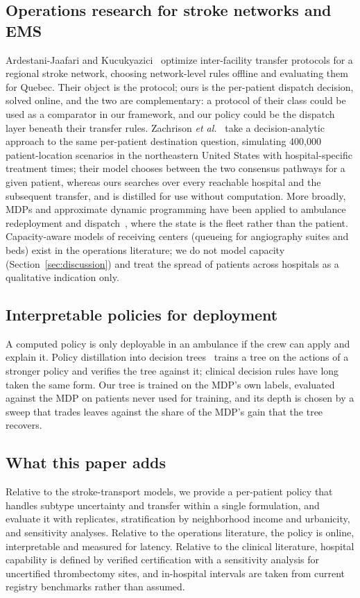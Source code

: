 \subsection{Operations research for stroke networks and EMS}
Ardestani-Jaafari and Kucukyazici~\cite{ardestani2022} optimize inter-facility transfer protocols for a regional stroke network, choosing network-level rules offline and evaluating them for Quebec. Their object is the protocol; ours is the per-patient dispatch decision, solved online, and the two are complementary: a protocol of their class could be used as a comparator in our framework, and our policy could be the dispatch layer beneath their transfer rules. Zachrison \emph{et al.}~\cite{zachrison2026} take a decision-analytic approach to the same per-patient destination question, simulating 400,000 patient-location scenarios in the northeastern United States with hospital-specific treatment times; their model chooses between the two consensus pathways for a given patient, whereas ours searches over every reachable hospital and the subsequent transfer, and is distilled for use without computation. More broadly, MDPs and approximate dynamic programming have been applied to ambulance redeployment and dispatch~\cite{maxwell2010}, where the state is the fleet rather than the patient. Capacity-aware models of receiving centers (queueing for angiography suites and beds) exist in the operations literature; we do not model capacity (Section~\ref{sec:discussion}) and treat the spread of patients across hospitals as a qualitative indication only.

\subsection{Interpretable policies for deployment}
A computed policy is only deployable in an ambulance if the crew can apply and explain it. Policy distillation into decision trees~\cite{bastani2018} trains a tree on the actions of a stronger policy and verifies the tree against it; clinical decision rules have long taken the same form. Our tree is trained on the MDP's own labels, evaluated against the MDP on patients never used for training, and its depth is chosen by a sweep that trades leaves against the share of the MDP's gain that the tree recovers.

\subsection{What this paper adds}
Relative to the stroke-transport models, we provide a per-patient policy that handles subtype uncertainty and transfer within a single formulation, and evaluate it with replicates, stratification by neighborhood income and urbanicity, and sensitivity analyses. Relative to the operations literature, the policy is online, interpretable and measured for latency. Relative to the clinical literature, hospital capability is defined by verified certification with a sensitivity analysis for uncertified thrombectomy sites, and in-hospital intervals are taken from current registry benchmarks rather than assumed.
